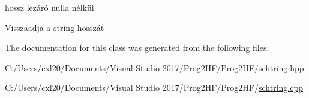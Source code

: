 hossz lezáró nulla nélkül 

Visszaadja a string hosszát 

The documentation for this class was generated from the following files\+:\begin{DoxyCompactItemize}
\item 
C\+:/\+Users/cxl20/\+Documents/\+Visual Studio 2017/\+Prog2\+H\+F/\+Prog2\+H\+F/\mbox{\hyperlink{schtring_8hpp}{schtring.\+hpp}}\item 
C\+:/\+Users/cxl20/\+Documents/\+Visual Studio 2017/\+Prog2\+H\+F/\+Prog2\+H\+F/\mbox{\hyperlink{schtring_8cpp}{schtring.\+cpp}}\end{DoxyCompactItemize}
